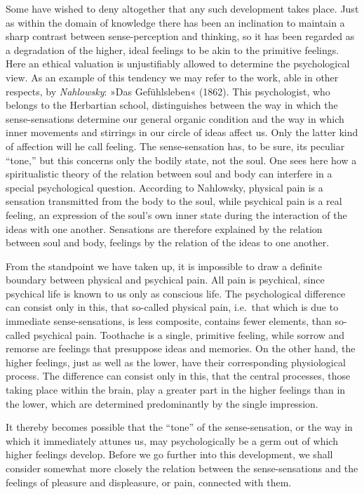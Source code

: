 \documentclass[12pt,a4paper]{book}
\newcommand{\opage}[1]{\marginnote{\footnotesize\textit{[#1]}}}
\begin{document}
Some have wished to deny altogether that any such development takes
place. Just as within the domain of knowledge there has been an
inclination to maintain a sharp contrast between sense-perception and
thinking, so it has been regarded as a degradation of the higher, ideal
feelings to be akin to the primitive feelings. Here an ethical valuation
is unjustifiably allowed to determine the psychological view. As an
example of this tendency we may refer to the work, able in other
respects, by \emph{Nahlowsky}: »Das Gefühlsleben« (1862). This
psychologist,
\opage{269}who belongs to the Herbartian school, distinguishes between
the way in which the sense-sensations determine our general organic
condition and the way in which inner movements and stirrings in our
circle of ideas affect us. Only the latter kind of affection will he
call feeling. The sense-sensation has, to be sure, its peculiar
``tone,'' but this concerns only the bodily state, not the soul. One
sees here how a spiritualistic theory of the relation between soul and
body can interfere in a special psychological question. According to
Nahlowsky, physical pain is a sensation transmitted from the body to the
soul, while psychical pain is a real feeling, an expression of the
soul's own inner state during the interaction of the ideas with one
another. Sensations are therefore explained by the relation between soul
and body, feelings by the relation of the ideas to one another.

From the standpoint we have taken up, it is impossible to draw a
definite boundary between physical and psychical pain. All pain is
psychical, since psychical life is known to us only as conscious life.
The psychological difference can consist only in this, that so-called
physical pain, i.e.\ that which is due to immediate sense-sensations,
is less composite, contains fewer elements, than so-called psychical
pain. Toothache is a single, primitive feeling, while sorrow and remorse
are feelings that presuppose ideas and memories. On the other hand, the
higher feelings, just as well as the lower, have their corresponding
physiological process. The difference can consist only in this, that
the central processes, those taking place within the brain, play a
greater part in the higher feelings than in the lower, which are
determined predominantly by the single impression.

It thereby becomes possible that the ``tone'' of the sense-sensation, or
the way in which it immediately attunes us, may psychologically be a
germ out of which higher feelings develop. Before we go further into
this development, we shall consider somewhat more closely the relation
between the sense-sensations and the feelings of pleasure and
displeasure, or pain, connected with them.
\end{document}

